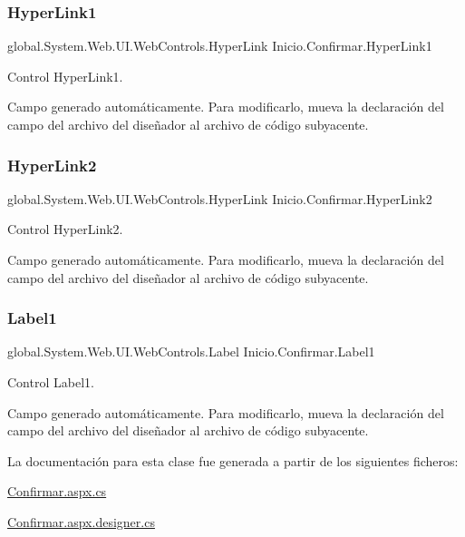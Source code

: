 \subsubsection{\texorpdfstring{HyperLink1}{HyperLink1}}
{\footnotesize\ttfamily global.\+System.\+Web.\+U\+I.\+Web\+Controls.\+Hyper\+Link Inicio.\+Confirmar.\+Hyper\+Link1\hspace{0.3cm}{\ttfamily [protected]}}



Control Hyper\+Link1. 

Campo generado automáticamente. Para modificarlo, mueva la declaración del campo del archivo del diseñador al archivo de código subyacente. \mbox{\label{classInicio_1_1Confirmar_adbc12b387c3590f83453888d8192db9a}} 
\subsubsection{\texorpdfstring{HyperLink2}{HyperLink2}}
{\footnotesize\ttfamily global.\+System.\+Web.\+U\+I.\+Web\+Controls.\+Hyper\+Link Inicio.\+Confirmar.\+Hyper\+Link2\hspace{0.3cm}{\ttfamily [protected]}}



Control Hyper\+Link2. 

Campo generado automáticamente. Para modificarlo, mueva la declaración del campo del archivo del diseñador al archivo de código subyacente. \mbox{\label{classInicio_1_1Confirmar_a0422c86bf977b315fd681b02c0f5f352}} 
\subsubsection{\texorpdfstring{Label1}{Label1}}
{\footnotesize\ttfamily global.\+System.\+Web.\+U\+I.\+Web\+Controls.\+Label Inicio.\+Confirmar.\+Label1\hspace{0.3cm}{\ttfamily [protected]}}



Control Label1. 

Campo generado automáticamente. Para modificarlo, mueva la declaración del campo del archivo del diseñador al archivo de código subyacente. 

La documentación para esta clase fue generada a partir de los siguientes ficheros\+:\begin{DoxyCompactItemize}
\item 
\mbox{\hyperlink{Confirmar_8aspx_8cs}{Confirmar.\+aspx.\+cs}}\item 
\mbox{\hyperlink{Confirmar_8aspx_8designer_8cs}{Confirmar.\+aspx.\+designer.\+cs}}\end{DoxyCompactItemize}
